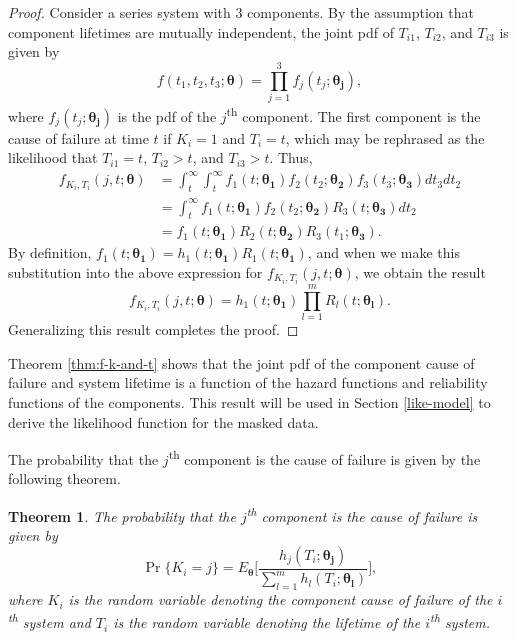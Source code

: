 \documentclass[
]{article}
\theoremstyle{definition}
\theoremstyle{plain}
\newtheorem{theorem}{Theorem}[section]
\theoremstyle{definition}
\theoremstyle{definition}
\theoremstyle{definition}
\theoremstyle{definition}
\theoremstyle{remark}
\begin{document}
\begin{proof}
Consider a series system with \(3\) components.
By the assumption that component lifetimes are mutually independent,
the joint pdf of \(T_{i 1}\), \(T_{i 2}\), and \(T_{i 3}\) is given by
\[
    f(t_1,t_2,t_3;\boldsymbol{\theta}) = \prod_{j=1}^{3} f_j(t_j;\boldsymbol{\theta_j}),
\]
where \(f_j(t_j;\boldsymbol{\theta_j})\) is the pdf of the \(j\)\textsuperscript{th} component.
The first component is the cause of failure at time \(t\) if \(K_i = 1\) and
\(T_i = t\), which may be rephrased as the likelihood that \(T_{i 1} = t\),
\(T_{i 2} > t\), and \(T_{i 3} > t\). Thus,
\begin{align*}
f_{K_i,T_i}(j,t;\boldsymbol{\theta}) 
    &= \int_t^{\infty} \int_t^{\infty}
        f_1(t;\boldsymbol{\theta_1}) f_2(t_2;\boldsymbol{\theta_2}) f_3(t_3;\boldsymbol{\theta_3})
        dt_3 dt_2\\
     &= \int_t^{\infty} f_1(t;\boldsymbol{\theta_1}) f_2(t_2;\boldsymbol{\theta_2})
        R_3(t;\boldsymbol{\theta_3}) dt_2\\
     &= f_1(t;\boldsymbol{\theta_1}) R_2(t;\boldsymbol{\theta_2}) R_3(t_1;\boldsymbol{\theta_3}).
\end{align*}
By definition, \(f_1(t;\boldsymbol{\theta_1}) = h_1(t;\boldsymbol{\theta_1}) R_1(t;\boldsymbol{\theta_1})\),
and when we make this substitution into the above expression for \(f_{K_i,T_i}(j,t;\boldsymbol{\theta})\),
we obtain the result
\[
f_{K_i,T_i}(j,t;\boldsymbol{\theta}) = h_1(t;\boldsymbol{\theta_1}) \prod_{l=1}^m R_l(t;\boldsymbol{\theta_l}).
\]
Generalizing this result completes the proof.
\end{proof}

Theorem \ref{thm:f-k-and-t} shows that the joint pdf of the component cause of
failure and system lifetime is a function of the hazard functions and reliability
functions of the components. This result will be used in Section \ref{like-model}
to derive the likelihood function for the masked data.

The probability that the \(j\)\textsuperscript{th} component is the cause of failure
is given by the following theorem.

\begin{theorem}
\protect\hypertarget{thm:prob-k}{}\label{thm:prob-k}The probability that the \(j\)\textsuperscript{th} component is the cause of failure
is given by
\begin{equation}
\label{eq:prob-k}
\Pr\{K_i = j\} = E_{\boldsymbol{\theta}}
\biggl[
    \frac{h_j(T_i;\boldsymbol{\theta_j})}
         {\sum_{l=1}^m h_l(T_i ; \boldsymbol{\theta_l})}
\biggr],
\end{equation}
where \(K_i\) is the random variable denoting the component cause of failure of the
\(i\)\textsuperscript{th} system and \(T_i\) is the random variable denoting the
lifetime of the \(i\)\textsuperscript{th} system.
\end{theorem}
\end{document}
